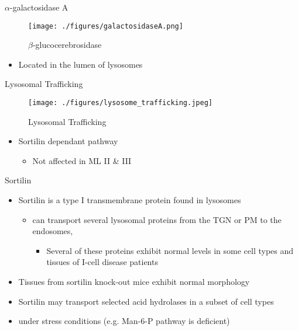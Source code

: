 \documentclass[presentation, smaller]{beamer}
\begin{document}
\begin{frame}[label={sec:orgheadline4}]{\(\alpha\)-galactosidase A}
\begin{figure}[htb]
\centering
\texttt{[image: ./figures/galactosidaseA.png]}
\caption[block]{\label{fig:sidase}
\(\beta\)-glucocerebrosidase}
\end{figure}

\begin{itemize}
\item Located in the lumen of lysosomes
\end{itemize}
\end{frame}

\begin{frame}[label={sec:orgheadline5}]{Lysosomal Trafficking}
\begin{figure}[htb]
\centering
\texttt{[image: ./figures/lysosome\_trafficking.jpeg]}
\caption[traf]{\label{fig:traf}
Lysosomal Trafficking}
\end{figure}
\begin{itemize}
\item Sortilin dependant pathway
\begin{itemize}
\item Not affected in ML II \& III
\end{itemize}
\end{itemize}
\end{frame}

\begin{frame}[label={sec:orgheadline6}]{Sortilin}
\begin{itemize}
\item Sortilin is a type I transmembrane protein found in lysosomes
\begin{itemize}
\item can transport several lysosomal proteins from the TGN or PM to the endosomes,
\begin{itemize}
\item Several of these proteins exhibit normal levels in some cell types and tissues of I-cell disease patients
\end{itemize}
\end{itemize}
\item Tissues from sortilin knock-out mice exhibit normal morphology
\item Sortilin may transport selected acid hydrolases in a subset of cell types
\item under stress conditions (e.g. Man-6-P pathway is deficient)
\end{itemize}
\end{frame}
\end{document}
